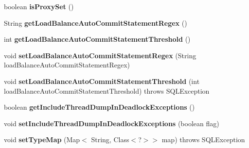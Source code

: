 \begin{DoxyCompactItemize}
boolean {\bfseries is\+Proxy\+Set} ()
\item 
\mbox{\label{classcom_1_1mysql_1_1jdbc_1_1_multi_host_my_s_q_l_connection_a14ad6f2fd3c7e5a29c77c7028cdfbcba}} 
String {\bfseries get\+Load\+Balance\+Auto\+Commit\+Statement\+Regex} ()
\item 
\mbox{\label{classcom_1_1mysql_1_1jdbc_1_1_multi_host_my_s_q_l_connection_aa65368907ddb3a1c12f3eb38748a1f2a}} 
int {\bfseries get\+Load\+Balance\+Auto\+Commit\+Statement\+Threshold} ()
\item 
\mbox{\label{classcom_1_1mysql_1_1jdbc_1_1_multi_host_my_s_q_l_connection_a572c00c57eba4c798ff38de2dc3394b0}} 
void {\bfseries set\+Load\+Balance\+Auto\+Commit\+Statement\+Regex} (String load\+Balance\+Auto\+Commit\+Statement\+Regex)
\item 
\mbox{\label{classcom_1_1mysql_1_1jdbc_1_1_multi_host_my_s_q_l_connection_a3a9cbbb5025e052d30c5141de9464169}} 
void {\bfseries set\+Load\+Balance\+Auto\+Commit\+Statement\+Threshold} (int load\+Balance\+Auto\+Commit\+Statement\+Threshold)  throws S\+Q\+L\+Exception 
\item 
\mbox{\label{classcom_1_1mysql_1_1jdbc_1_1_multi_host_my_s_q_l_connection_a45b3e9feea77f2e059415ac9e15ee2c5}} 
boolean {\bfseries get\+Include\+Thread\+Dump\+In\+Deadlock\+Exceptions} ()
\item 
\mbox{\label{classcom_1_1mysql_1_1jdbc_1_1_multi_host_my_s_q_l_connection_a8711af8d597776d1f0c040be8096f8cf}} 
void {\bfseries set\+Include\+Thread\+Dump\+In\+Deadlock\+Exceptions} (boolean flag)
\item 
\mbox{\label{classcom_1_1mysql_1_1jdbc_1_1_multi_host_my_s_q_l_connection_a6c4ca623c0bfe6d6085dcb4dab725abe}} 
void {\bfseries set\+Type\+Map} (Map$<$ String, Class$<$?$>$$>$ map)  throws S\+Q\+L\+Exception 
\item 
$$
\end{DoxyCompactItemize}
